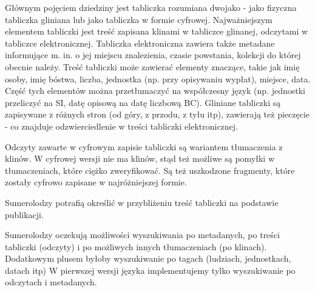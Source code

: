 Głównym pojęciem dziedziny jest tabliczka rozumiana dwojako - jako fizyczna tabliczka gliniana lub jako tabliczka w formie cyfrowej. Najważniejszym elementem tabliczki jest treść zapisana klinami w tabliczce glinanej, odczytami w tabliczce elektronicznej. Tabliczka elektroniczna zawiera także metadane informujące m. in. o jej miejscu znalezienia, czasie powstania, kolekcji do której obecnie należy.
Treść tabliczki może zawierać elementy znaczące, takie jak imię 
osoby, imię bóstwa, liczba, jednostka (np. przy opisywaniu wypłat), miejsce, data. Część tych elementów można przetłumaczyć na 
współczesny język (np. jednostki przeliczyć na SI, datę opisową na datę liczbową BC). Gliniane tabliczki są zapisywane z różnych stron 
(od góry, z przodu, z tyłu itp), zawierają też pieczęcie - co znajduje odzwierciedlenie w treści tabliczki elektronicznej. 

Odczyty zawarte w cyfrowym zapisie tabliczki są wariantem tłumaczenia z klinów. W cyfrowej wersji nie ma klinów, stąd też możliwe
są pomyłki w tłumaczeniach, które ciężko zweryfikować. Są też uszkodzone fragmenty, które zostały cyfrowo zapisane w najróżniejszej
formie.


Sumerolodzy potrafią określić w przybliżeniu treść tabliczki na podstawie publikacji.

Sumerolodzy oczekują możliwości wyszukiwania po metadanych, po treści tabliczki (odczyty) i po możliwych innych tłumaczeniach (po klinach). Dodatkowym plusem byłoby wyszukiwanie po tagach (ludziach, jednostkach, datach itp)
W pierwszej wersji języka implementujemy tylko wyszukiwanie po odczytach i metadanych.